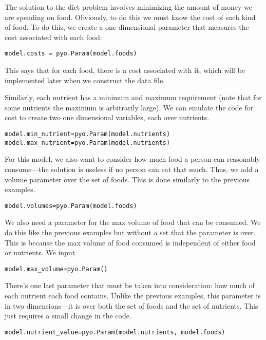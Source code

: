 \documentclass{article}
\begin{document}
The solution to the diet problem involves minimizing the amount of money we are spending on food.  Obviously, to do this we must know the cost of each kind of food.  To do this, we create a one dimensional parameter that measures the cost associated with each food:

\begin{verbatim}model.costs = pyo.Param(model.foods)\end{verbatim}

\noindent
This says that for each food, there is a cost associated with it, which will be implemented later when we construct the data file.

Similarly, each nutrient has a minimum and maximum requirement (note that for some nutrients the maximum is arbitrarily large).  We can emulate the code for cost to create two one dimensional variables, each over nutrients.

\begin{verbatim}model.min_nutrient=pyo.Param(model.nutrients)
model.max_nutrient=pyo.Param(model.nutrients)\end{verbatim}

For this model, we also want to consider how much food a person can reasonably consume---the solution is useless if no person can eat that much.  Thus, we add a volume parameter over the set of foods.  This is done similarly to the previous examples.

\begin{verbatim}model.volumes=pyo.Param(model.foods)\end{verbatim}

We also need a parameter for the max volume of food that can be consumed.  We do this like the previous examples but without a set that the parameter is over.  This is because the max volume of food consumed is independent of either food or nutrients.  We input

\begin{verbatim}model.max_volume=pyo.Param()\end{verbatim}

There's one last parameter that must be taken into consideration: how much of each nutrient each food contains.  Unlike the previous examples, this parameter is in two dimensions---it is over both the set of foods and the set of nutrients.  This just requires a small change in the code.

\begin{verbatim}model.nutrient_value=pyo.Param(model.nutrients, model.foods) \end{verbatim}
\end{document}
